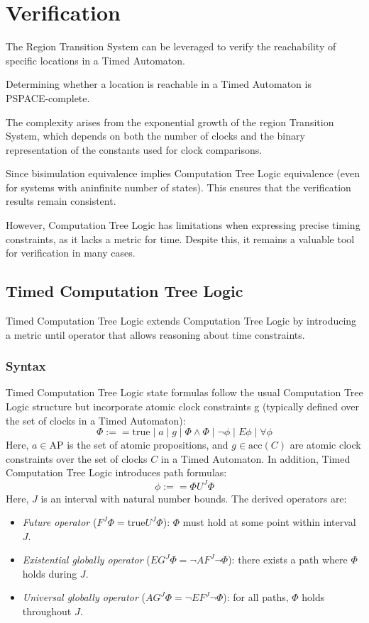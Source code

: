 \section{Verification}

The Region Transition System can be leveraged to verify the reachability of specific locations in a Timed Automaton.
\begin{theorem}
    Determining whether a location is reachable in a Timed Automaton is \\ PSPACE-complete.
\end{theorem}
\noindent The complexity arises from the exponential growth of the region Transition System, which depends on both the number of clocks and the binary representation of the constants used for clock comparisons.

Since bisimulation equivalence implies Computation Tree Logic equivalence (even for systems with aninfinite number of states).
This ensures that the verification results remain consistent.

However, Computation Tree Logic has limitations when expressing precise timing constraints, as it lacks a metric for time. 
Despite this, it remains a valuable tool for verification in many cases.

\subsection{Timed Computation Tree Logic}
Timed Computation Tree Logic extends Computation Tree Logic by introducing a metric until operator that allows reasoning about time constraints.

\subsubsection{Syntax}
Timed Computation Tree Logic state formulas follow the usual Computation Tree Logic structure but incorporate atomic clock constraints g (typically defined over the set of clocks in a Timed Automaton):
\[\Phi:==\text{true}\mid a \mid g \mid \Phi \land \Phi \mid \lnot\phi \mid E\phi\mid \forall\phi\]
\noindent Here, $a\in\text{AP}$ is the set of atomic propositions, and $g\in\text{acc}(C)$ are atomic clock constraints over the set of clocks $C$ in a Timed Automaton. 
In addition, Timed Computation Tree Logic introduces path formulas:
\[\phi:==\Phi U^J\Phi\]
\noindent Here, $J$ is an interval with natural number bounds.
The derived operators are: 
\begin{itemize}
    \item \textit{Future operator} ($F^J\Phi=\text{true}U^J\Phi$): $\Phi$ must hold at some point within interval $J$.
    \item \textit{Existential globally operator} ($EG^J\Phi=\lnot AF^J\lnot\Phi$): there exists a path where $\Phi$ holds during $J$.
    \item \textit{Universal globally operator} ($AG^J\Phi=\lnot EF^J\lnot\Phi$): for all paths, $\Phi$ holds throughout $J$.
\end{itemize}

